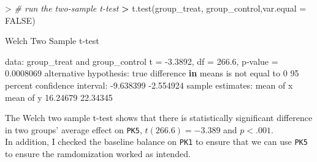 \documentclass[
]{article}
\newenvironment{Shaded}{\begin{snugshade}}{\end{snugshade}}
\newcommand{\AttributeTok}[1]{\textcolor[rgb]{0.77,0.63,0.00}{#1}}
\newcommand{\CommentTok}[1]{\textcolor[rgb]{0.56,0.35,0.01}{\textit{#1}}}
\newcommand{\ConstantTok}[1]{\textcolor[rgb]{0.00,0.00,0.00}{#1}}
\newcommand{\ControlFlowTok}[1]{\textcolor[rgb]{0.13,0.29,0.53}{\textbf{#1}}}
\newcommand{\DecValTok}[1]{\textcolor[rgb]{0.00,0.00,0.81}{#1}}
\newcommand{\ErrorTok}[1]{\textcolor[rgb]{0.64,0.00,0.00}{\textbf{#1}}}
\newcommand{\FloatTok}[1]{\textcolor[rgb]{0.00,0.00,0.81}{#1}}
\newcommand{\FunctionTok}[1]{\textcolor[rgb]{0.00,0.00,0.00}{#1}}
\newcommand{\NormalTok}[1]{#1}
\newcommand{\OtherTok}[1]{\textcolor[rgb]{0.56,0.35,0.01}{#1}}
\newcommand{\SpecialCharTok}[1]{\textcolor[rgb]{0.00,0.00,0.00}{#1}}
\begin{document}
\begin{Shaded}
\begin{Highlighting}[]
\SpecialCharTok{\textgreater{}} \CommentTok{\# run the two{-}sample t{-}test}
\ErrorTok{\textgreater{}} \FunctionTok{t.test}\NormalTok{(group\_treat, group\_control,}\AttributeTok{var.equal =} \ConstantTok{FALSE}\NormalTok{)}

\NormalTok{    Welch Two Sample t}\SpecialCharTok{{-}}\NormalTok{test}

\NormalTok{data}\SpecialCharTok{:}\NormalTok{  group\_treat and group\_control}
\NormalTok{t }\OtherTok{=} \SpecialCharTok{{-}}\FloatTok{3.3892}\NormalTok{, df }\OtherTok{=} \FloatTok{266.6}\NormalTok{, p}\SpecialCharTok{{-}}\NormalTok{value }\OtherTok{=} \FloatTok{0.0008069}
\NormalTok{alternative hypothesis}\SpecialCharTok{:}\NormalTok{ true difference }\ControlFlowTok{in}\NormalTok{ means is not equal to }\DecValTok{0}
\DecValTok{95}\NormalTok{ percent confidence interval}\SpecialCharTok{:}
 \SpecialCharTok{{-}}\FloatTok{9.638399} \SpecialCharTok{{-}}\FloatTok{2.554924}
\NormalTok{sample estimates}\SpecialCharTok{:}
\NormalTok{mean of x mean of y }
 \FloatTok{16.24679}  \FloatTok{22.34345} 
\end{Highlighting}
\end{Shaded}

The Welch two sample t-test shows that there is statistically
significant difference in two groups' average effect on \texttt{PK5},
\(t(266.6)=-3.389\) and \(p <.001\).\\
In addition, I checked the baseline balance on \texttt{PK1} to ensure
that we can use \texttt{PK5} to ensure the ramdomization worked as
intended.

\begin{Shaded}
\end{Shaded}
\end{document}
